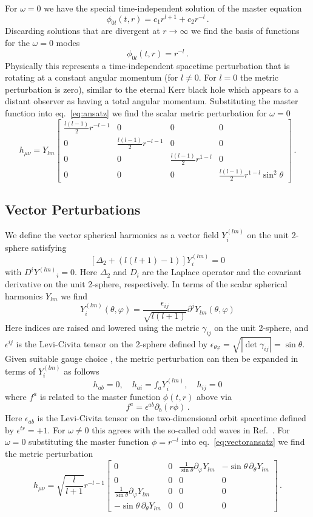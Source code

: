 \documentclass{brownthesis}
\begin{document}
For $\omega=0$ we have the special time-independent solution of the
master equation
\[
\phi_{0l}(t,r)=c_{1}r^{l+1}+c_{2}r^{-l}\,.
\]
Discarding solutions that are divergent at $r\to\infty$ we find the
basis of functions for the $\omega=0$ modes
\[
\phi_{0l}(t,r)=r^{-l}\,.
\]
Physically this represents a time-independent spacetime perturbation
that is rotating at a constant angular momentum (for $l\neq0$. For
$l=0$ the metric perturbation is zero), similar to the eternal Kerr
black hole which appears to a distant observer as having a total angular
momentum. Substituting the master function into eq.~\ref{eq:ansatz}
we find the scalar metric perturbation for $\omega=0$
\[
h_{\mu\nu}=Y_{lm}\begin{bmatrix}\frac{l(l-1)}{2}r^{-l-1} & 0 & 0 & 0\\
0 & \frac{l(l-1)}{2}r^{-l-1} & 0 & 0\\
0 & 0 & \frac{l(l-1)}{2}r^{1-l} & 0\\
0 & 0 & 0 & \frac{l(l-1)}{2}r^{1-l}\sin^{2}\theta
\end{bmatrix}\,.
\]


\subsection{Vector Perturbations}

We define the vector spherical harmonics as a vector field $Y_{i}^{(lm)}$
on the unit 2-sphere satisfying
\[
[\Delta_{2}+(l(l+1)-1)]Y_{i}^{(lm)}=0
\]
with $D^{i}Y^{(lm)}{}_{i}=0$. Here $\Delta_{2}$ and $D_{i}$ are
the Laplace operator and the covariant derivative on the unit 2-sphere,
respectively. In terms of the scalar spherical harmonics $Y_{lm}$
we find
\[
Y_{i}^{(lm)}(\theta,\varphi)=\frac{\epsilon_{ij}}{\sqrt{l(l+1)}}\partial^{j}Y_{lm}(\theta,\varphi)
\]
Here indices are raised and lowered using the metric $\gamma_{ij}$
on the unit 2-sphere, and $\epsilon^{ij}$ is the Levi-Civita tensor
on the 2-sphere defined by $\epsilon_{\theta\varphi}=\sqrt{|\det\gamma_{ij}|}=\sin\theta$.
Given suitable gauge choice \cite{PhysRev.108.1063}, the metric perturbation
can then be expanded in terms of $Y_{i}^{(lm)}$ as follows
\begin{equation}
h_{ab}=0,\quad h_{ai}=f_{a}Y_{i}^{(lm)},\quad h_{ij}=0\label{eq:vectoransatz}
\end{equation}
where $f^{a}$ is related to the master function $\phi(t,r)$ above
via
\[
f^{a}=\epsilon^{ab}\partial_{b}(r\phi)\,.
\]
Here $\epsilon_{ab}$ is the Levi-Civita tensor on the two-dimensional
orbit spacetime defined by $\epsilon^{tr}=+1$. For $\omega\neq0$
this agrees with the so-called odd waves in Ref.~\cite{PhysRev.108.1063}.
For $\omega=0$ substituting the master function $\phi=r^{-l}$ into
eq.~\ref{eq:vectoransatz} we find the metric perturbation
\[
h_{\mu\nu}=\sqrt{\frac{l}{l+1}}r^{-l-1}\begin{bmatrix}0 & 0 & \frac{1}{\sin\theta}\partial_{\varphi}Y_{lm} & -\sin\theta\,\partial_{\theta}Y_{lm}\\
0 & 0 & 0 & 0\\
\frac{1}{\sin\theta}\partial_{\varphi}Y_{lm} & 0 & 0 & 0\\
-\sin\theta\,\partial_{\theta}Y_{lm} & 0 & 0 & 0
\end{bmatrix}\,.
\]
\end{document}
